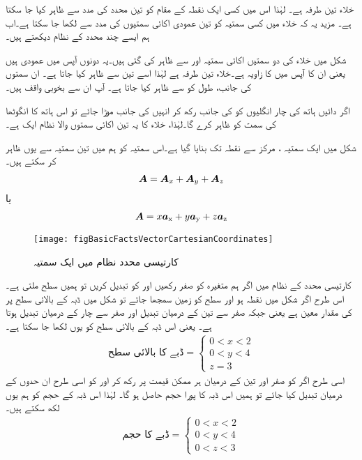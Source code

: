 	 خلاء تین طرفہ ہے۔ لہٰذا اس میں کسی ایک نقطہ کے مقام کو تین محدد کی مدد سے ظاہر کیا جا سکتا ہے۔ مزید یہ کہ خلاء میں کسی سمتیہ کو تین عمودی اکائی سمتیوں کی مدد سے لکھا جا سکتا ہے۔اب ہم ایسے چند محدد کے نظام دیکھتے ہیں۔

	شکل    میں خلاء کی دو سمتیں اکائی سمتیہ  اور  سے ظاہر کی گئی ہیں۔یہ دونوں  آپس میں عمودی ہیں یعنی ان کا آپس میں   کا زاویہ ہے۔خلاء تین طرفہ ہے لہٰذا اسے تین  سے ظاہر کیا جاتا ہے۔ ان سمتوں کی جانب،  طول  کو  سے ظاہر کیا جاتا ہے۔ آپ ان سے بخوبی واقف ہیں۔ 


	 اگر دائیں ہاتھ کی چار انگلیوں کو  کی جانب رکھ کر انہیں  کی جانب موڑا جائے تو اس ہاتھ کا انگوٹھا  کی سمت کو ظاہر کرے گا۔لہٰذا،  خلاء کا  یہ  تین اکائی سمتوں والا نظام ایک   ہے۔

	شکل   میں ایک سمتیہ ، مرکز سے نقطہ  تک بنایا گیا ہے۔اس سمتیہ کو ہم  میں تین سمتیہ سے یوں ظاہر کر سکتے ہیں۔
\begin{align}
{\ensuremath{{\boldsymbol{A}}}}={{\boldsymbol{A}}}_x+{{\boldsymbol{A}}}_y+{{\boldsymbol{A}}}_z
\end{align}
یا
\begin{align}
{\ensuremath{{\boldsymbol{A}}}}=x{\boldsymbol{a}}_{\textup{x}}+y{\boldsymbol{a}}_{\textup{y}}+z{\boldsymbol{a}}_{\textup{z}}
\end{align}
%
\begin{figure}
\centering
\texttt{[image: figBasicFactsVectorCartesianCoordinates]}
\caption{کارتیسی محدد نظام میں ایک سمتیہ}
\label{شکل_حقائق_کارتیسی_نظام_ایک_سمتیہ}
\end{figure}
%
کارتیسی محدد کے نظام میں اگر ہم متغیرہ  کو صفر رکھیں اور  کو تبدیل کریں تو ہمیں  سطح  ملتی ہے۔ اس طرح اگر شکل   میں نقطہ  ہو اور  سطح کو زمین سمجھا جائے  تو شکل میں ڈبہ کے بالائی سطح پر   کی مقدار معین ہے یعنی   جبکہ  صفر سے تین کے درمیان تبدیل اور  صفر سے چار کے درمیان تبدیل ہوتا ہے۔ یعنی اس ڈبہ کے بالائی سطح کو یوں لکھا جا سکتا ہے۔ 
\begin{align}
 \text{ڈبے کا بالائی سطح}= \left\{ 
  \begin{array}{l}
    0<x<2\\
    0<y<4 \\
	 z=3
  \end{array} \right.
\end{align}
اسی طرح اگر  کو صفر اور تین کے درمیان ہر ممکن قیمت پر رکھ کر  اور  کو اسی طرح ان حدوں کے درمیان تبدیل کیا جائے تو ہمیں اس ڈبہ کا پورا حجم حاصل ہو گا۔ لہٰذا اس ڈبہ کے حجم کو ہم یوں لکھ سکتے ہیں۔
\begin{align}
 \text{ڈبے کا حجم}= \left\{ 
  \begin{array}{l}
    0<x<2\\
    0<y<4 \\
    0<z<3
  \end{array} \right.
\end{align}

